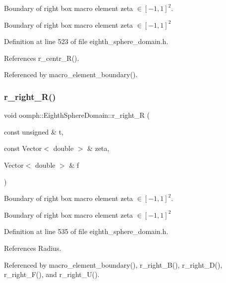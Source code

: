 Boundary of right box macro element zeta $ \in [-1,1]^2 $. 

Boundary of right box macro element zeta $ \in [-1,1]^2 $ 

Definition at line 523 of file eighth\+\_\+sphere\+\_\+domain.\+h.



References r\+\_\+centr\+\_\+\+R().



Referenced by macro\+\_\+element\+\_\+boundary().

\mbox{\label{classoomph_1_1EighthSphereDomain_a58ec95dc35f526fe5c6baa2578a2f786}} 
\subsubsection{\texorpdfstring{r\+\_\+right\+\_\+\+R()}{r\_right\_R()}}
{\footnotesize\ttfamily void oomph\+::\+Eighth\+Sphere\+Domain\+::r\+\_\+right\+\_\+R (\begin{DoxyParamCaption}\item[{const unsigned \&}]{t,  }\item[{const Vector$<$ double $>$ \&}]{zeta,  }\item[{Vector$<$ double $>$ \&}]{f }\end{DoxyParamCaption})\hspace{0.3cm}{\ttfamily [private]}}



Boundary of right box macro element zeta $ \in [-1,1]^2 $. 

Boundary of right box macro element zeta $ \in [-1,1]^2 $ 

Definition at line 535 of file eighth\+\_\+sphere\+\_\+domain.\+h.



References Radius.



Referenced by macro\+\_\+element\+\_\+boundary(), r\+\_\+right\+\_\+\+B(), r\+\_\+right\+\_\+\+D(), r\+\_\+right\+\_\+\+F(), and r\+\_\+right\+\_\+\+U().

\mbox{\label{classoomph_1_1EighthSphereDomain_a004a1adfe832e2b233f8ec1b6a58b9aa}} 
